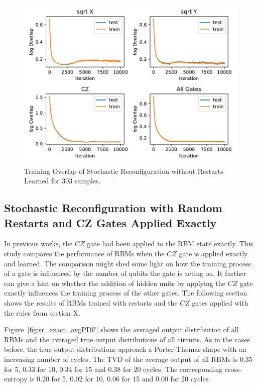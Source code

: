 \begin{figure}[H]
  \centering
  \includegraphics[width=\textwidth]{figures/results/SR-no-restarts-learned/avgOverlap_303.pdf}
  \caption[Training Overlap of Stochastic Reconfiguration without Restarts Learned]{Training 
  Overlap of Stochastic Reconfiguration without Restarts Learned for 303 samples.}
  \label{fig:sr_tvd}
\end{figure}

\newpage

\subsection{Stochastic Reconfiguration with Random Restarts and CZ Gates Applied Exactly}

In previous works, the $CZ$ gate had been applied to the RBM state exactly. This study compares 
the performance of RBMs when the $CZ$ gate is applied exactly and learned. The comparison might shed some 
light on how the training process of a gate is influenced by the number of qubits the gate 
is acting on. It further can give a hint on whether the addition of hidden units by applying the $CZ$
gate exactly influences the training process of the other gates.
The following section shows the results of RBMs trained with restarts and the $CZ$ gates applied 
with the rules from section X.

Figure~\ref{fig:sr_exact_avgPDF} shows the averaged output distribution of all RBMs and
the averaged true output distributions of all circuits. As in the cases before, the 
true output distributions approach a Porter-Thomas shape with an increasing number of cycles.
The TVD of the average output of all RBMs 
is 0.35 for 5, 0.33 for 10, 0.34 for 15 and 0.38 for 20 cycles. The corresponding cross-entropy is 
0.20 for 5, 0.02 for 10, 0.06 for 15 and 0.00 for 20 cycles.

